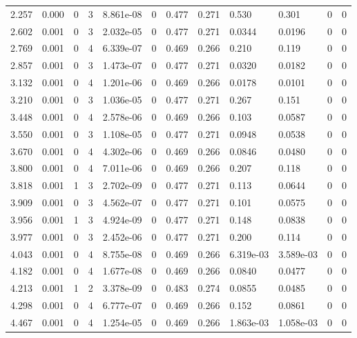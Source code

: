 \documentclass[preview]{standalone}
\begin{document}
{{\begin{tabular}{L{1.2cm}C{1.2cm} C{0.3cm}C{0.5cm} C{1.4cm}C{1.4cm} C{1.4cm}C{1.4cm} C{1.6cm}C{1.6cm} C{1.6cm}C{1.6cm}}
  2.257  &  0.000  & 0     &  3 &  8.861e-08  & 0  &  0.477&   0.271& 0.530 & 0.301   &  0 & 0  \\ 
  2.602  &  0.001  & 0     &  3 &  2.032e-05  & 0  &  0.477&   0.271& 0.0344 & 0.0196   &  0 & 0  \\ 
  2.769  &  0.001  & 0     &  4 &  6.339e-07  & 0  &  0.469&   0.266& 0.210 & 0.119   &  0 & 0  \\ 
  2.857  &  0.001  & 0     &  3 &  1.473e-07  & 0  &  0.477&   0.271& 0.0320 & 0.0182   &  0 & 0  \\ 
  3.132  &  0.001  & 0     &  4 &  1.201e-06  & 0  &  0.469&   0.266& 0.0178 & 0.0101   &  0 & 0  \\ 
  3.210  &  0.001  & 0     &  3 &  1.036e-05  & 0  &  0.477&   0.271& 0.267 & 0.151   &  0 & 0  \\ 
  3.448  &  0.001  & 0     &  4 &  2.578e-06  & 0  &  0.469&   0.266& 0.103 & 0.0587   &  0 & 0  \\ 
  3.550  &  0.001  & 0     &  3 &  1.108e-05  & 0  &  0.477&   0.271& 0.0948 & 0.0538   &  0 & 0  \\ 
  3.670  &  0.001  & 0     &  4 &  4.302e-06  & 0  &  0.469&   0.266& 0.0846 & 0.0480   &  0 & 0  \\ 
  3.800  &  0.001  & 0     &  4 &  7.011e-06  & 0  &  0.469&   0.266& 0.207 & 0.118   &  0 & 0  \\ 
  3.818  &  0.001  & 1     &  3 &  2.702e-09  & 0  &  0.477&   0.271& 0.113 & 0.0644   &  0 & 0  \\ 
  3.909  &  0.001  & 0     &  3 &  4.562e-07  & 0  &  0.477&   0.271& 0.101 & 0.0575   &  0 & 0  \\ 
  3.956  &  0.001  & 1     &  3 &  4.924e-09  & 0  &  0.477&   0.271& 0.148 & 0.0838   &  0 & 0  \\ 
  3.977  &  0.001  & 0     &  3 &  2.452e-06  & 0  &  0.477&   0.271& 0.200 & 0.114   &  0 & 0  \\ 
  4.043  &  0.001  & 0     &  4 &  8.755e-08  & 0  &  0.469&   0.266& 6.319e-03 & 3.589e-03   &  0 & 0  \\ 
  4.182  &  0.001  & 0     &  4 &  1.677e-08  & 0  &  0.469&   0.266& 0.0840 & 0.0477   &  0 & 0  \\ 
  4.213  &  0.001  & 1     &  2 &  3.378e-09  & 0  &  0.483&   0.274& 0.0855 & 0.0485   &  0 & 0  \\ 
  4.298  &  0.001  & 0     &  4 &  6.777e-07  & 0  &  0.469&   0.266& 0.152 & 0.0861   &  0 & 0  \\ 
  4.467  &  0.001  & 0     &  4 &  1.254e-05  & 0  &  0.469&   0.266& 1.863e-03 & 1.058e-03   &  0 & 0  \\ 

\end{tabular}}}
\end{document}
